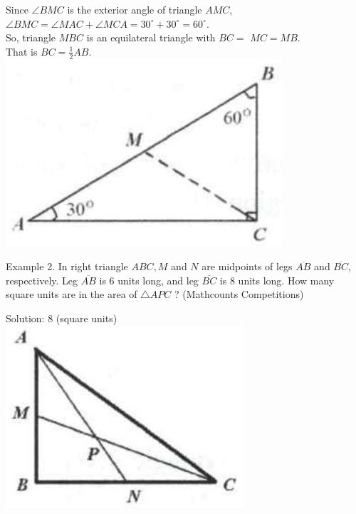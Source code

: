 \documentclass[10pt]{article}
\begin{document}
Since \(\angle B M C\) is the exterior angle of triangle \(A M C\), \(\angle B M C=\angle M A C+\angle M C A=30^{\circ}+30^{\circ}=60^{\circ}\).\\
So, triangle \(M B C\) is an equilateral triangle with \(B C=\) \(M C=M B\).\\
That is \(B C=\frac{1}{2} A B\).\\
\includegraphics[max width=\textwidth, center]{2025_04_17_97bc1f7e44d93c271a88g-009(3)}

Example 2. In right triangle \(A B C, M\) and \(N\) are midpoints of legs \(\overline{A B}\) and \(\overline{B C}\), respectively. Leg \(\overline{A B}\) is 6 units long, and leg \(\overline{B C}\) is 8 units long. How many square units are in the area of \(\triangle A P C\) ? (Mathcounts Competitions)

Solution: 8 (square units)\\
\includegraphics[max width=\textwidth, center]{2025_04_17_97bc1f7e44d93c271a88g-009(1)}
\end{document}
